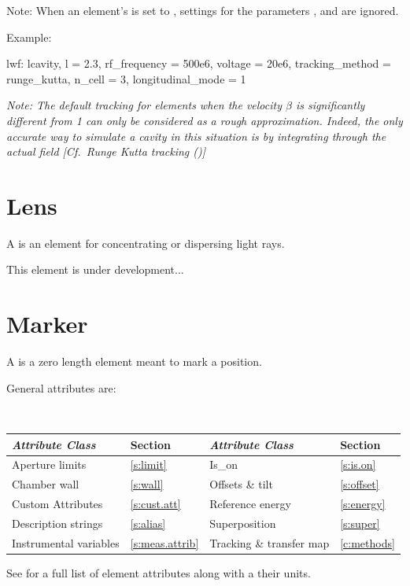 {Note: When an element's  is set to , settings for the
parameters , and  are ignored.

Example:
\begin{example}
  lwf: lcavity, l = 2.3, rf_frequency = 500e6, voltage = 20e6,
         tracking_method = runge_kutta, n_cell = 3, longitudinal_mode = 1
\end{example}

{\em Note: The default  tracking for  elements when the velocity
$\beta$ is significantly different from 1 can only be considered as a rough approximation. Indeed,
the only accurate way to simulate a cavity in this situation is by integrating through the actual
field [Cf.~Runge Kutta tracking ()]}

\newpage

\section{Lens}
\label{s:lens}

A  is an element for concentrating or dispersing light rays.

This element is under development...

\newpage

\section{Marker}
\label{s:mark}

A  is a zero length element meant to mark a position. 

General  attributes are:
\begin{center} 
\tt
\begin{tabular}{llll} \toprule
  {\sl Attribute Class}      & Section             & {\sl Attribute Class}        & Section         \\ \midrule
  Aperture limits            & \ref{s:limit}       & Is_on                        & \ref{s:is.on}   \\ 
  Chamber wall               & \ref{s:wall}        & Offsets \& tilt              & \ref{s:offset}  \\
  Custom Attributes          & \ref{s:cust.att}    & Reference energy             & \ref{s:energy}  \\
  Description strings        & \ref{s:alias}       & Superposition                & \ref{s:super}   \\
  Instrumental variables     & \ref{s:meas.attrib} & Tracking \& transfer map     & \ref{c:methods} \\ 
  \bottomrule
\end{tabular}
\end{center}
\toffset
See  for a full list of element attributes along with a their units.

}
